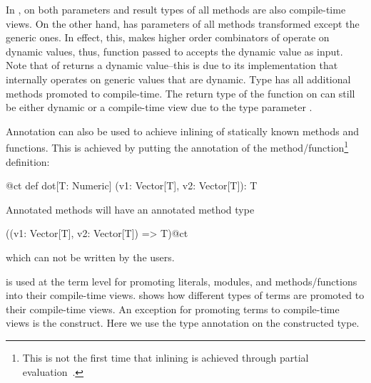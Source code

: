  In , on  both parameters and result types of all
 methods are also compile-time views. On the other hand,  has parameters
 of all methods transformed except the generic ones. In effect, this, makes higher order combinators of 
 operate on dynamic values, thus, function  passed to  accepts
 the dynamic value as input. Note that  of  returns a dynamic value--this is
 due to its implementation that internally operates on generic values that are dynamic.
 Type  has all additional methods promoted to compile-time. The return type of the function  on 
 can still be either dynamic or a compile-time view due to the type parameter .

Annotation  can also be used to achieve inlining of statically known methods and functions.
 This is achieved by putting the annotation of the method/function\footnote{This is not the first time
that inlining is achieved through partial evaluation~\cite{monnier2003inlining}.}
 definition:\begin{lstparagraph}
 @ct def dot[T: Numeric]
  (v1: Vector[T], v2: Vector[T]): T
\end{lstparagraph}
Annotated methods will have an annotated method type\begin{lstparagraph}
((v1: Vector[T], v2: Vector[T]) => T)@ct
\end{lstparagraph} which can not be written by the users.

 is used at the term level
 for promoting literals, modules, and methods/functions into their compile-time views.
  shows how different types of terms are promoted to their
 compile-time views. An exception for promoting terms to compile-time views is the
  construct. Here we use the type annotation on the constructed type.

